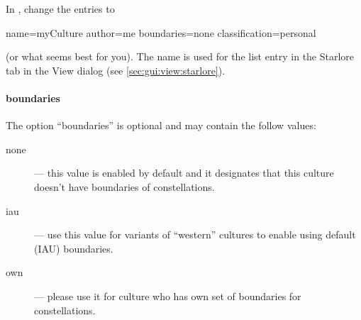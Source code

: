 In , change the entries to 
\begin{configfile}
[info]
name=myCulture
author=me
boundaries=none
classification=personal
\end{configfile}

\noindent (or what seems best for you). The name is used for the list entry in
the Starlore tab in the View dialog (see \ref{sec:gui:view:starlore}).

\paragraph{boundaries}
The option ``boundaries'' is optional and may contain the follow values:
\begin{description}
\item[none] --- this value is enabled by default and it designates that this culture doesn't have boundaries of constellations.
\item[iau] --- use this value for variants of ``western'' cultures to enable using default (IAU) boundaries.
\item[own] --- please use it for culture who has own set of boundaries for constellations.
\end{description}

